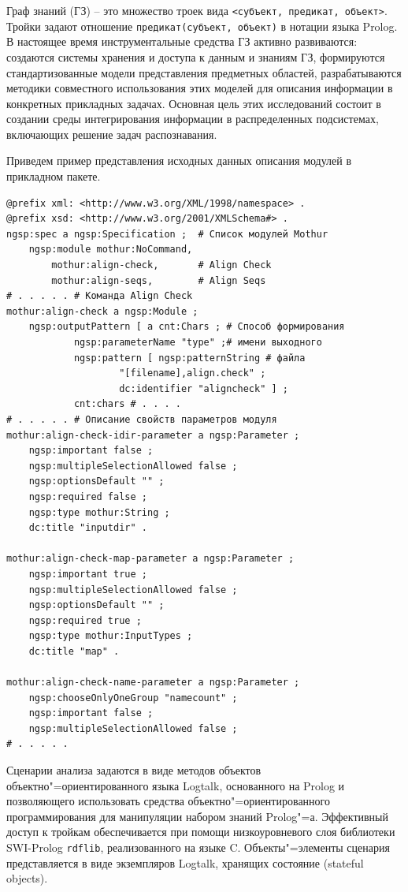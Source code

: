 \documentclass[12pt]{article}
\begin{document}
Граф знаний (ГЗ) -- это множество троек вида \texttt{<субъект, предикат, объект>}.  Тройки задают отношение \texttt{предикат(субъект, объект)} в нотации языка Prolog.  В настоящее время инструментальные средства ГЗ активно развиваются: создаются системы хранения и доступа к данным и знаниям ГЗ, формируются стандартизованные модели представления предметных областей, разрабатываются методики совместного использования этих моделей для описания информации в конкретных прикладных задачах.  Основная цель этих исследований состоит в создании среды интегрирования информации в распределенных подсистемах, включающих решение задач распознавания.

Приведем пример представления исходных данных описания модулей в прикладном пакете.
\begin{verbatim}
@prefix xml: <http://www.w3.org/XML/1998/namespace> .
@prefix xsd: <http://www.w3.org/2001/XMLSchema#> .
ngsp:spec a ngsp:Specification ;  # Список модулей Mothur
    ngsp:module mothur:NoCommand,
        mothur:align-check,       # Align Check
        mothur:align-seqs,        # Align Seqs
# . . . . . # Команда Align Check
mothur:align-check a ngsp:Module ;
    ngsp:outputPattern [ a cnt:Chars ; # Способ формирования
            ngsp:parameterName "type" ;# имени выходного
            ngsp:pattern [ ngsp:patternString # файла
                    "[filename],align.check" ;
                    dc:identifier "aligncheck" ] ;
            cnt:chars # . . . .
# . . . . . # Описание свойств параметров модуля
mothur:align-check-idir-parameter a ngsp:Parameter ;
    ngsp:important false ;
    ngsp:multipleSelectionAllowed false ;
    ngsp:optionsDefault "" ;
    ngsp:required false ;
    ngsp:type mothur:String ;
    dc:title "inputdir" .

mothur:align-check-map-parameter a ngsp:Parameter ;
    ngsp:important true ;
    ngsp:multipleSelectionAllowed false ;
    ngsp:optionsDefault "" ;
    ngsp:required true ;
    ngsp:type mothur:InputTypes ;
    dc:title "map" .

mothur:align-check-name-parameter a ngsp:Parameter ;
    ngsp:chooseOnlyOneGroup "namecount" ;
    ngsp:important false ;
    ngsp:multipleSelectionAllowed false ;
# . . . . .
\end{verbatim}

Сценарии анализа задаются в виде методов объектов объектно"=ориентированного языка Logtalk, основанного на Prolog и позволяющего использовать средства объектно"=ориентированного программирования для манипуляции набором знаний Prolog"=а. Эффективный доступ к тройкам обеспечивается при помощи низкоуровневого слоя библиотеки SWI-Prolog \texttt{rdflib}, реализованного на языке C.  Объекты"=элементы сценария представляется в виде экземпляров Logtalk, хранящих состояние (stateful objects).
\end{document}
